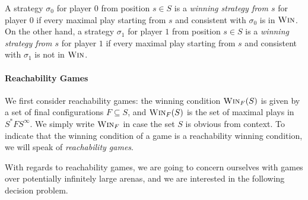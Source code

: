 \documentclass[a4paper,UKenglish,cleveref, autoref, thm-restate]{lipics-v2021}
\newcommand{\problemx}[3]{
	\vspace{0.2cm}
\par\noindent\underline{\sc#1}\par\nobreak\vskip.2\baselineskip
\begingroup\clubpenalty10000\widowpenalty10000
\setbox0\hbox{\bf INPUT:\ }\setbox1\hbox{\bf QUESTION:\ }
\dimen0=\wd0\ifnum\wd1>\dimen0\dimen0=\wd1\fi
\vskip-\parskip\noindent
\hbox to\dimen0{\box0\hfil}\hangindent\dimen0\hangafter1\ignorespaces#2\par
\vskip-\parskip\noindent
\hbox to\dimen0{\box1\hfil}\hangindent\dimen0\hangafter1\ignorespaces#3\par
\endgroup
	\vspace{-0.2cm}
}
\newcommand{\win}{\textsc{Win}}
\begin{document}

A strategy $\sigma_0$ for player $0$ from position $s \in S$ is a {\em winning strategy
 from $s$} for player $0$ if 
every maximal play starting from $s$ and consistent with $\sigma_0$ is in $\win$.
On the other hand, a strategy $\sigma_1$ for player $1$ from position $s \in S$ is a {\em winning strategy
 from $s$} for player $1$ if 
every maximal play starting from $s$ and consistent with $\sigma_1$ is not in $\win$.
 

\paragraph{Reachability Games}

We first consider reachability games: 
the winning condition $\win_F(S)$ is given by a set of final configurations
$F \subseteq S$, and $\win_F(S)$ is the set of maximal plays in $S^* F S^\infty$. 
We simply write
$\win_F$ in case the set $S$ is obvious from context.
To indicate that the winning condition of a game is a reachability winning condition, we will speak of {\em reachability games}. 


With regards to reachability games, we are going to concern ourselves with games over potentially infinitely large arenas, and we are interested in the following decision problem. \newline


\end{document}
